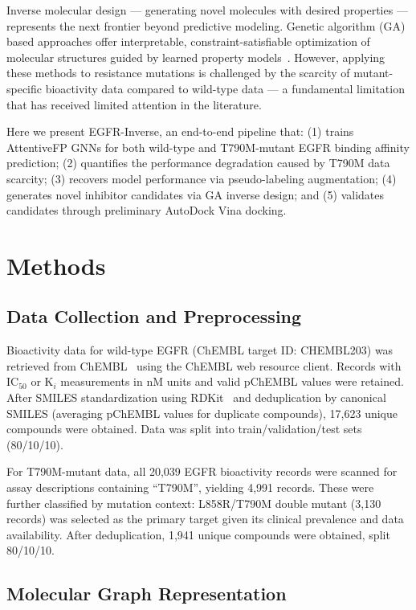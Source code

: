\documentclass[11pt]{article}
\begin{document}
Inverse molecular design --- generating novel molecules with desired properties ---
represents the next frontier beyond predictive modeling. Genetic algorithm (GA)
based approaches offer interpretable, constraint-satisfiable optimization of
molecular structures guided by learned property models~\cite{jensen2019}.
However, applying these methods to resistance mutations is challenged by the
scarcity of mutant-specific bioactivity data compared to wild-type data ---
a fundamental limitation that has received limited attention in the literature.

Here we present EGFR-Inverse, an end-to-end pipeline that:
(1) trains AttentiveFP GNNs for both wild-type and T790M-mutant EGFR binding
affinity prediction;
(2) quantifies the performance degradation caused by T790M data scarcity;
(3) recovers model performance via pseudo-labeling augmentation;
(4) generates novel inhibitor candidates via GA inverse design; and
(5) validates candidates through preliminary AutoDock Vina docking.

\section{Methods}

\subsection{Data Collection and Preprocessing}

Bioactivity data for wild-type EGFR (ChEMBL target ID: CHEMBL203) was retrieved
from ChEMBL~\cite{gaulton2017} using the ChEMBL web resource client.
Records with IC$_{50}$ or K$_i$ measurements in nM units and valid pChEMBL
values were retained. After SMILES standardization using RDKit~\cite{rdkit}
and deduplication by canonical SMILES (averaging pChEMBL values for duplicate
compounds), 17,623 unique compounds were obtained.
Data was split into train/validation/test sets (80/10/10).

For T790M-mutant data, all 20,039 EGFR bioactivity records were scanned for
assay descriptions containing ``T790M'', yielding 4,991 records.
These were further classified by mutation context:
L858R/T790M double mutant (3,130 records) was selected as the primary target
given its clinical prevalence and data availability.
After deduplication, 1,941 unique compounds were obtained, split 80/10/10.

\subsection{Molecular Graph Representation}
\end{document}
